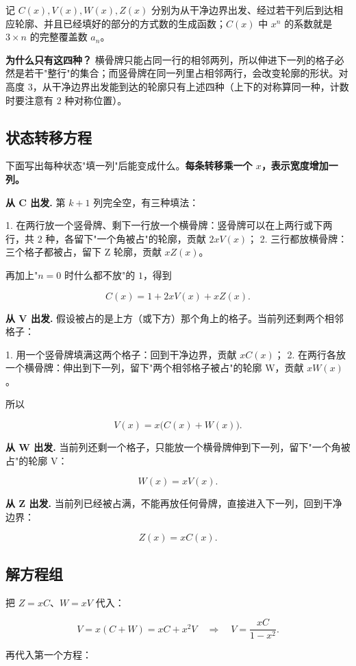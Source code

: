 记 $C(x),V(x),W(x),Z(x)$ 分别为从干净边界出发、经过若干列后到达相应轮廓、并且已经填好的部分的方式数的生成函数；$C(x)$ 中 $x^n$ 的系数就是 $3\times n$ 的完整覆盖数 $a_n$。

\textbf{为什么只有这四种？} 横骨牌只能占同一行的相邻两列，所以伸进下一列的格子必然是若干"整行"的集合；而竖骨牌在同一列里占相邻两行，会改变轮廓的形状。对高度 $3$，从干净边界出发能到达的轮廓只有上述四种（上下的对称算同一种，计数时要注意有 $2$ 种对称位置）。

\subsection{状态转移方程}


下面写出每种状态"填一列"后能变成什么。\textbf{每条转移乘一个 $x$，表示宽度增加一列。}

\textbf{从 C 出发.} 第 $k+1$ 列完全空，有三种填法：

1. 在两行放一个竖骨牌、剩下一行放一个横骨牌：竖骨牌可以在上两行或下两行，共 $2$ 种，各留下"一个角被占"的轮廓，贡献 $2xV(x)$；
2. 三行都放横骨牌：三个格子都被占，留下 Z 轮廓，贡献 $xZ(x)$。

再加上"$n=0$ 时什么都不放"的 $1$，得到

\[
C(x)=1+2xV(x)+xZ(x).
\]

\textbf{从 V 出发.} 假设被占的是上方（或下方）那个角上的格子。当前列还剩两个相邻格子：

1. 用一个竖骨牌填满这两个格子：回到干净边界，贡献 $xC(x)$；
2. 在两行各放一个横骨牌：伸出到下一列，留下"两个相邻格子被占"的轮廓 W，贡献 $xW(x)$。

所以

\[
V(x)=x\bigl(C(x)+W(x)\bigr).
\]

\textbf{从 W 出发.} 当前列还剩一个格子，只能放一个横骨牌伸到下一列，留下"一个角被占"的轮廓 V：

\[
W(x)=xV(x).
\]

\textbf{从 Z 出发.} 当前列已经被占满，不能再放任何骨牌，直接进入下一列，回到干净边界：

\[
Z(x)=xC(x).
\]

\subsection{解方程组}


把 $Z=xC$、$W=xV$ 代入：

\[
V=x(C+W)=xC+x^2V
\quad\Longrightarrow\quad
V=\frac{xC}{1-x^2}.
\]

再代入第一个方程：

